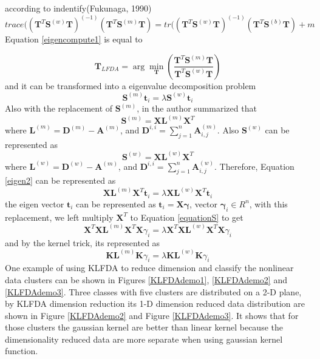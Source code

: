 \noindent according to indentify(Fukunaga, 1990)
\begin{equation}
trace((\bm{T}^T\bm{S}^{(w)}\bm{T})^{(-1)}(\bm{T}^T\bm{S}^{(m)}\bm{T}) = tr((\bm{T}^T\bm{S}^{(w)}\bm{T})^{(-1)}(\bm{T}^T\bm{S}^{(b)}\bm{T}) + m
\end{equation}
Equation \ref{eigencompute1} is equal to 

\begin{equation}
\bm{T}_{LFDA}  = \arg\min_{\bm{T}} (\frac{\bm{T}^T\bm{S}^{(m)}\bm{T}}{\bm{T}^T\bm{S}^{(w)}\bm{T}})
\end{equation}
and it can be transformed into a eigenvalue decomposition problem 
\begin{equation}\label{eigen2}
\bm{S}^{(m)}\bm{t}_i  = \lambda \bm{S}^{(w)}\bm{t}_i
\end{equation}
Also with the replacement of $\bm{S}^{(m)}$, in \cite{KLFDA} the author summarized that 
\begin{equation}
\bm{S}^{(m)} = \bm{X}\bm{L}^{(m)}\bm{X}^T
\end{equation}
where $\bm{L}^{(m)}  = \bm{D}^{(m)} - \bm{A}^{(m)}$, and $ \bm{D}^{i,i} = \sum_{j=1}^n  \bm{A}_{i,j}^{(m)}$. Also $\bm{S}^{(w)}$ can be represented as 
\begin{equation}
\bm{S}^{(w)} = \bm{X}\bm{L}^{(w)}\bm{X}^T
\end{equation}
where $\bm{L}^{(w)}  = \bm{D}^{(w)} - \bm{A}^{(m)}$, and $ \bm{D}^{i,i} = \sum_{j=1}^n  \bm{A}_{i,j}^{(w)}$. 
Therefore, Equation \ref{eigen2} can be represented as
\begin{equation}\label{equationS}
\bm{X}\bm{L}^{(m)}\bm{X}^T \bm{t}_i= \lambda\bm{X}\bm{L}^{(w)}\bm{X}^T \bm{t}_i
\end{equation}
the eigen vector $\bm{t}_i$  can be represented as $\bm{t}_i = \bm{X}\bm{\gamma}$, vector $\bm{\gamma}_i \in R^n$, with this replacement, we left multiply $\bm{X}^T$ to Equation \ref{equationS} to get 
\begin{equation}
\bm{X}^T\bm{X}\bm{L}^{(m)}\bm{X}^T\bm{X}\gamma_i = \lambda\bm{X}^T\bm{X}\bm{L}^{(w)}\bm{X}^T \bm{X}\gamma_i
\end{equation}
and by the kernel trick, its represented as
\begin{equation}
\bm{K}\bm{L}^{(m)}\bm{K}\gamma_i  = \lambda \bm{K}\bm{L}^{(w)}\bm{K}\gamma_i
\end{equation}
One example of using KLFDA to reduce dimension and classify the nonlinear data clusters can be shown in Figures \ref{KLFDAdemo1}, \ref{KLFDAdemo2} and \ref{KLFDAdemo3}. Three classes with five clusters are distributed on a 2-D plane, by KLFDA dimension reduction its 1-D dimension reduced data distribution are shown in Figure \ref{KLFDAdemo2} and Figure \ref{KLFDAdemo3}. It shows that for those clusters the gaussian kernel are better than linear kernel because the dimensionality reduced data are more separate when using gaussian kernel function.

